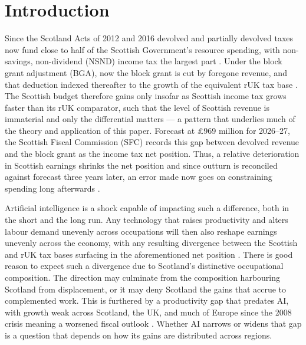 \section{Introduction}\label{sec:intro}
Since the Scotland Acts of 2012 and 2016 devolved and partially devolved taxes now fund close to half of the Scottish Government's resource spending, with non-savings, non-dividend (NSND) income tax the largest part \citep{sfc2026}. Under the block grant adjustment (BGA), now the block grant is cut by foregone revenue, and that deduction indexed thereafter to the growth of the equivalent rUK tax base \citep{gov2023}. The Scottish budget therefore gains only insofar as Scottish income tax grows faster than its rUK comparator, such that the level of Scottish revenue is immaterial and only the differential matters --- a pattern that underlies much of the theory and application of this paper. Forecast at £969 million for 2026--27, the Scottish Fiscal Commission (SFC) records this gap between devolved revenue and the block grant as the income tax net position. Thus, a relative deterioration in Scottish earnings shrinks the net position and since outturn is reconciled against forecast three years later, an error made now goes on constraining spending long afterwards \citep{gov2023}.

Artificial intelligence is a shock capable of impacting such a difference, both in the short and the long run. Any technology that raises productivity and alters labour demand unevenly across occupations will then also reshape earnings unevenly across the economy, with any resulting divergence between the Scottish and rUK tax bases surfacing in the aforementioned net position \citep{sfc2016}. There is good reason to expect such a divergence due to Scotland's distinctive occupational composition. The direction may culminate from the composition harbouring Scotland from displacement, or it may deny Scotland the gains that accrue to complemented work. This is furthered by a productivity gap that predates AI, with growth weak across Scotland, the UK, and much of Europe since the 2008 crisis meaning a worsened fiscal outlook \citep{sfc2026}. Whether AI narrows or widens that gap is a question that depends on how its gains are distributed across regions.



